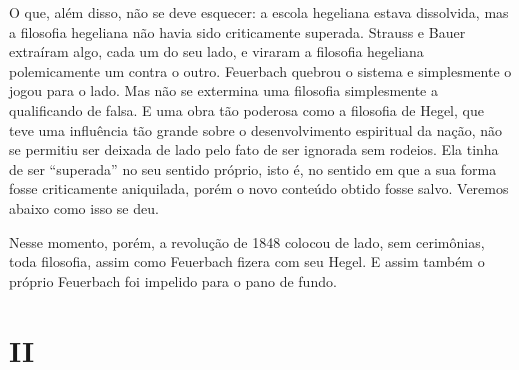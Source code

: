 O que, além disso, não se deve esquecer: a escola
hegeliana estava dissolvida, mas a filosofia hegeliana não havia sido criticamente
superada. Strauss e Bauer extraíram
algo, cada um do seu lado, e viraram a filosofia hegeliana polemicamente
um contra o
outro. Feuerbach quebrou
o sistema e simplesmente o jogou para o lado. Mas não se extermina uma
filosofia simplesmente a qualificando de falsa. E uma obra tão poderosa
como a filosofia
de Hegel,
que teve uma influência tão grande sobre o desenvolvimento espiritual da
nação, não se permitiu ser deixada de lado pelo fato de ser ignorada sem
rodeios. Ela tinha de ser ``superada'' no seu sentido 
próprio, isto é, no sentido em que a sua forma fosse criticamente
aniquilada, porém o novo conteúdo obtido fosse salvo.
Veremos abaixo como isso se deu.

Nesse momento, porém, a revolução de 1848 colocou de lado, sem %
cerimônias, toda filosofia, assim como Feuerbach fizera com seu Hegel. E assim também o próprio Feuerbach foi impelido para o pano de fundo.

\quebra

\mbox{}
\vspace{2cm}

\section{II}

